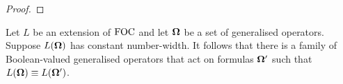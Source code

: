 \documentclass[../main/thesis.tex]{subfiles}
\begin{document}
\begin{proof}

\end{proof}

\begin{lem}
  Let $L$ be an extension of $\text{\upshape FOC}$ and let $\mathbf{\mathbf{\Omega}}$ be a set of generalised
  operators. Suppose $L(\mathbf{\mathbf{\Omega}})$ has constant number-width. It follows that
  there is a family of Boolean-valued generalised operators that act on formulas
  $\mathbf{\mathbf{\Omega}}'$ such that $L(\mathbf{\mathbf{\Omega}}) \equiv L(\mathbf{\mathbf{\Omega}}')$.
\end{lem}
\end{document}
